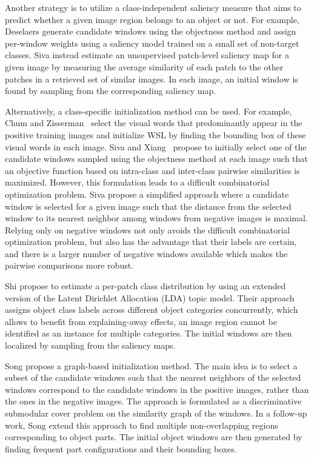 \documentclass[10pt,journal,cspaper,final,twocolumn,compsoc]{./IEEEtran}
\begin{document}
Another strategy is to utilize a class-independent 
saliency measure that aims to predict whether a given
image region belongs to an object or not. For example,
Deselaers \etal\cite{deselaers12ijcv} generate candidate windows using
the objectness method \cite{alexe12pami} and assign
per-window weights using a saliency model trained on a
small set of non-target classes.
Siva \etal\cite{siva13cvpr} instead estimate an unsupervised
patch-level saliency map for a given image by measuring
the average similarity of each patch to the other patches
in a retrieved set of similar images. In each image, an initial window  is found by sampling from the corresponding
saliency map.

Alternatively, a class-specific initialization method can
be used. For example, Chum and Zisserman~\cite{chum07cvpr} select the
visual words that predominantly appear in the positive
training images and initialize WSL by finding the 
bounding box of these visual words in each image.
Siva and Xiang~\cite{siva11iccv} propose to initially select one of the
candidate windows sampled using the objectness method at
each image such that an objective function based on
intra-class and inter-class pairwise similarities is
maximized.  However, this formulation leads to a difficult
combinatorial optimization problem. Siva \etal\cite{siva12eccv}
propose a simplified approach where a candidate window is
selected for a given image such that the distance from the
selected window to its nearest neighbor among windows from
negative images is maximal.  Relying only on negative windows
not only avoids the difficult combinatorial optimization
problem, but also has the advantage that their labels are
certain, 
and there is a larger number of negative windows available
which makes the pairwise comparisons more robust. 

Shi \etal\cite{shi13iccv} propose to estimate a per-patch class
distribution by using an extended version of the Latent
Dirichlet Allocation (LDA) \cite{blei03jmlr} topic model.
Their approach assigns object class labels across
different object categories concurrently, which allows to
benefit from explaining-away effects, \ie an image region
cannot be identified as an instance for multiple
categories. The initial windows are then localized by
sampling from the saliency maps.

Song \etal\cite{song14icml} propose a graph-based
initialization method.  The main idea is to select a
subset of the candidate windows such that the nearest
neighbors of the selected windows correspond 
to the candidate windows in the positive images, rather
than the ones in the negative images. The approach is
formulated as a discriminative submodular cover problem on
the similarity graph of the 
windows. In a follow-up work, Song \etal\cite{song14nips} extend this approach to find
multiple non-overlapping regions corresponding to object
parts.  The initial object windows are then generated by
finding frequent part configurations and their bounding
boxes. 
\end{document}

